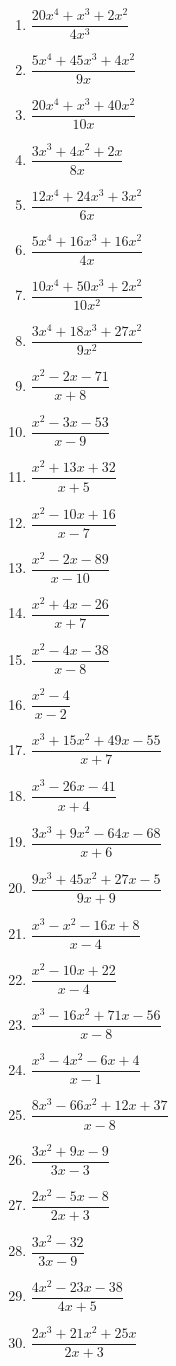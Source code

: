 \documentclass[12pt]{article}
\theoremstyle{definition}
\begin{document}
\begin{multicols}{3}
\begin{enumerate}
  \item $\dfrac{20 x^4 + x^3 + 2 x^2}{4 x^3}$
  \item $\dfrac{5 x^4 + 45 x^3 + 4 x^2}{9 x}$
  \item $\dfrac{20 x^4 + x^3 + 40 x^2}{10 x}$
  \item $\dfrac{3 x^3 + 4 x^2 + 2 x}{8 x}$
  \item $\dfrac{12 x^4 + 24 x^3 + 3 x^2}{6 x}$
  \item $\dfrac{5 x^4 + 16 x^3 + 16 x^2}{4 x}$
  \item $\dfrac{10 x^4 + 50 x^3 + 2 x^2}{10 x^2}$
  \item $\dfrac{3 x^4 + 18 x^3 + 27 x^2}{9 x^2}$
  \item $\dfrac{x^2 - 2 x - 71}{x + 8}$\label{polydiv_one}
  \item $\dfrac{x^2 - 3 x - 53}{x - 9}$
  \item $\dfrac{x^2 + 13 x + 32}{x + 5}$
  \item $\dfrac{x^2 - 10 x + 16}{x - 7}$
  \item $\dfrac{x^2 - 2 x - 89}{x - 10}$
  \item $\dfrac{x^2 + 4 x - 26}{x + 7}$
  \item $\dfrac{x^2 - 4 x - 38}{x - 8}$
  \item $\dfrac{x^2 - 4}{x - 2}$
  \item $\dfrac{x^3 + 15 x^2 + 49 x - 55}{x + 7}$
  \item $\dfrac{x^3 - 26 x - 41}{x + 4}$
  \item $\dfrac{3 x^3 + 9 x^2 - 64 x - 68}{x + 6}$
  \item $\dfrac{9 x^3 + 45 x^2 + 27 x - 5}{9 x + 9}$
  \item $\dfrac{x^3 - x^2 - 16 x + 8}{x - 4}$
  \item $\dfrac{x^2 - 10 x + 22}{x - 4}$
  \item $\dfrac{x^3 - 16 x^2 + 71 x - 56}{x - 8}$
  \item $\dfrac{x^3 - 4 x^2 - 6 x + 4}{x - 1}$
  \item $\dfrac{8 x^3 - 66 x^2 + 12 x + 37}{x - 8}$
  \item $\dfrac{3 x^2 + 9 x - 9}{3 x - 3}$
  \item $\dfrac{2 x^2 - 5 x - 8}{2 x + 3}$
  \item $\dfrac{3 x^2 - 32}{3 x - 9}$
  \item $\dfrac{4 x^2 - 23 x - 38}{4 x + 5}$
  \item $\dfrac{2 x^3 + 21 x^2 + 25 x}{2 x + 3}$

\end{enumerate}
\end{multicols}
\end{document}
